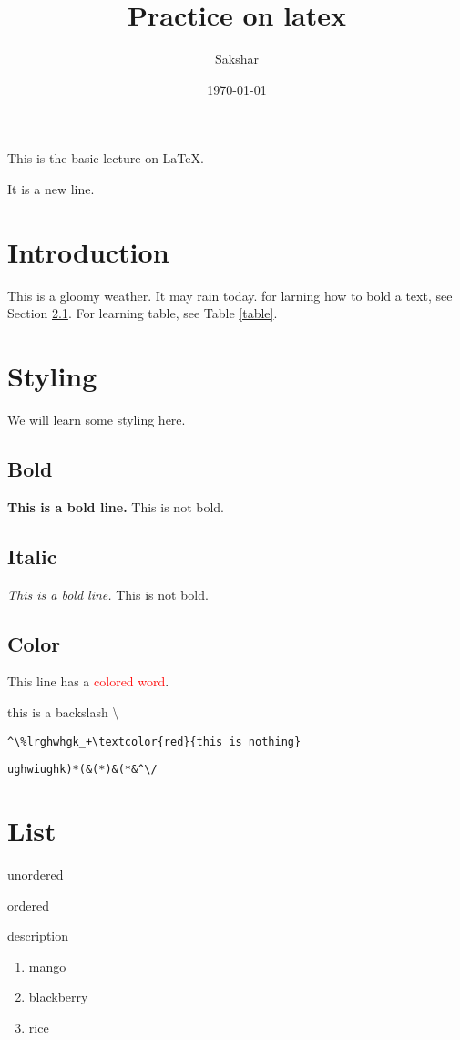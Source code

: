 \documentclass{article}
\title{Practice on latex}
\author{Sakshar}
\date{\today}
\begin{document}
\maketitle
\tableofcontents
This is the basic lecture on \LaTeX.

\noindent It is a new line.

\section{Introduction}

This is a gloomy weather. It may rain today.  for larning how to bold a text, see Section \ref{bold}. For learning table, see Table \ref{table}.

\section{Styling}
We will learn some styling here.

\subsection{Bold}\label{bold}
\textbf{This is a bold line.} This is not bold.

\subsection*{Italic}
\emph{This is a \emph{bold} line.} This is not bold.

\subsection{Color}
This line has a \textcolor{red}{colored word}.

this is a backslash \textbackslash

\verb|^\%lrghwhgk_+\textcolor{red}{this is nothing}|

\begin{verbatim}
ughwiughk)*(&(*)&(*&^\/
\end{verbatim}

\section{List}

unordered

ordered

description

\begin{enumerate}
	\item mango
	\item blackberry
	\item rice
\end{enumerate}
\end{document}
